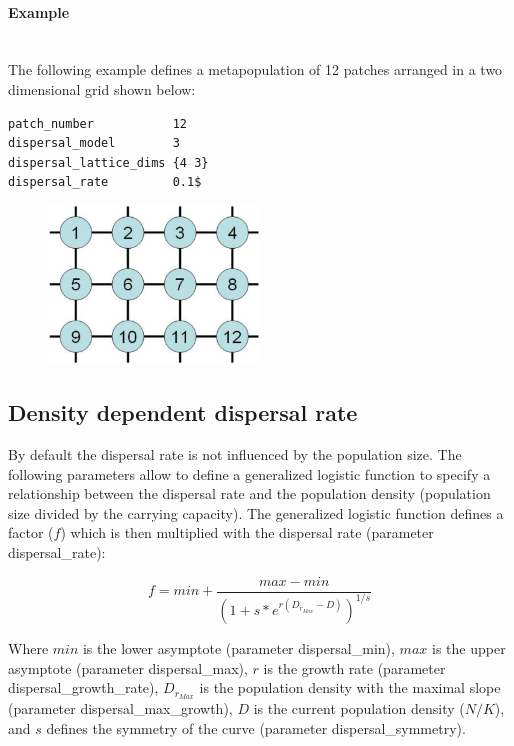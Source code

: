 \documentclass[letterpaper,12pt,oneside]{book}
\begin{document}
\paragraph{Example}\hspace*{\fill}\\
The following example defines a metapopulation of 12 patches arranged in a two dimensional grid shown below:
\begin{lstlisting}[frame=single]
patch_number           12
dispersal_model        3
dispersal_lattice_dims {4 3}
dispersal_rate         0.1$
\end{lstlisting}

\begin{figure}[h]
	\centering
		\includegraphics[width=0.50\textwidth]{Grid-2D.pdf}
	\label{fig:Grid-2D}
\end{figure}

\subsection{Density dependent dispersal rate}
By default the dispersal rate is not influenced by the population size. The following parameters allow to define a generalized logistic function \citep{Richards_1959} to specify a relationship between the dispersal rate and the population density (population size divided by the carrying capacity). The generalized logistic function defines a factor ($f$) which is then multiplied with the dispersal rate (parameter \textsf{dispersal\_rate}): 

	\[ f = min + \frac{max-min}{(1+s*e^{r(D_{r_{Max}}-D)})^{1/s}} \] 
	
Where $min$ is the lower asymptote (parameter \textsf{dispersal\_min}), $max$ is the upper asymptote (parameter \textsf{dispersal\_max}), $r$ is the growth rate (parameter \textsf{dispersal\_growth\_rate}), $D_{r_{Max}}$ is the population density with the maximal slope (parameter \textsf{dispersal\_max\_growth}), $D$ is the current population density ($N/K$), and $s$ defines the symmetry of the curve (parameter \textsf{dispersal\_symmetry}). 
\end{document}
